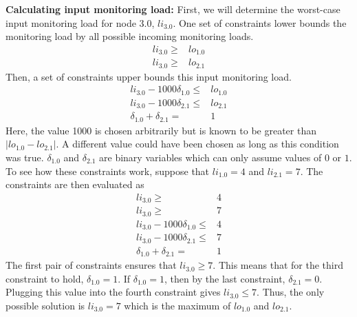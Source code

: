 {\bf Calculating input monitoring load:}
First, we will determine the worst-case input monitoring load for node 3.0,
$li_{3.0}$.  One set of constraints lower bounds the monitoring load by all
possible incoming monitoring loads.
\begin{align*}
  li_{3.0} \geq& lo_{1.0} \\
  li_{3.0} \geq& lo_{2.1} 
\end{align*}
Then, a set of constraints upper bounds this input monitoring load.
\begin{align*}
  li_{3.0} - 1000 \delta_{1.0} \leq& lo_{1.0} \\
  li_{3.0} - 1000 \delta_{2.1} \leq& lo_{2.1} \\
  \delta_{1.0} + \delta_{2.1} =& 1
\end{align*}
Here, the value 1000 is chosen arbitrarily but is known to be greater than
$|lo_{1.0} - lo_{2.1}|$.  A different value could have been chosen as long as
this condition was true.  $\delta_{1.0}$ and $\delta_{2.1}$ are binary
variables which can only assume values of $0$ or $1$.  To see how these
constraints work, suppose that $li_{1.0} = 4$ and $li_{2.1} = 7$. The
constraints are then evaluated as
\begin{align*}
  li_{3.0} \geq& 4 \\
  li_{3.0} \geq& 7 \\
  li_{3.0} - 1000 \delta_{1.0} \leq& 4 \\
  li_{3.0} - 1000 \delta_{2.1} \leq& 7 \\
  \delta_{1.0} + \delta_{2.1} =& 1
\end{align*}
The first pair of constraints ensures that $li_{3.0} \geq 7$. This means that
for the third constraint to hold, $\delta_{1.0} = 1$. If $\delta_{1.0} = 1$,
then by the last constraint, $\delta_{2.1} = 0$. Plugging this value into the
fourth constraint gives $li_{3.0} \leq 7$. Thus, the only possible solution is
$li_{3.0} = 7$ which is the maximum of $lo_{1.0}$ and $lo_{2.1}$.

